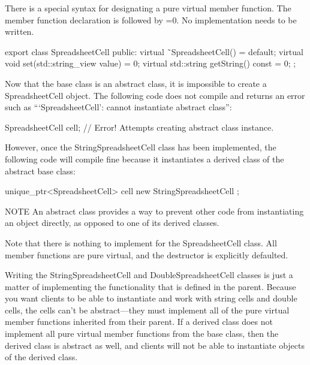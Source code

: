 There is a special syntax for designating a pure virtual member function. The member function declaration is followed by =0. No implementation needs to be written.

\begin{cpp}
export class SpreadsheetCell
{
    public:
        virtual ˜SpreadsheetCell() = default;
        virtual void set(std::string_view value) = 0;
        virtual std::string getString() const = 0;
};
\end{cpp}

Now that the base class is an abstract class, it is impossible to create a SpreadsheetCell object. The following code does not compile and returns an error such as “‘SpreadsheetCell’: cannot instantiate abstract class”:

\begin{cpp}
SpreadsheetCell cell; // Error! Attempts creating abstract class instance.
\end{cpp}

However, once the StringSpreadsheetCell class has been implemented, the following code will compile fine because it instantiates a derived class of the abstract base class:

\begin{cpp}
unique_ptr<SpreadsheetCell> cell { new StringSpreadsheetCell {} };
\end{cpp}

\begin{myNotic}{NOTE}
An abstract class provides a way to prevent other code from instantiating an object directly, as opposed to one of its derived classes.
\end{myNotic}

Note that there is nothing to implement for the SpreadsheetCell class. All member functions are pure virtual, and the destructor is explicitly defaulted.


Writing the StringSpreadsheetCell and DoubleSpreadsheetCell classes is just a matter of implementing the functionality that is defined in the parent. Because you want clients to be able to instantiate and work with string cells and double cells, the cells can’t be abstract—they must implement all of the pure virtual member functions inherited from their parent. If a derived class does not implement all pure virtual member functions from the base class, then the derived class is abstract as well, and clients will not be able to instantiate objects of the derived class.

